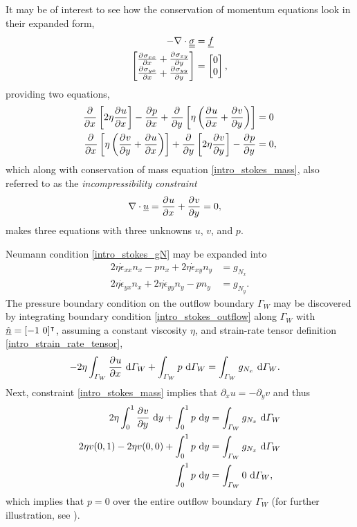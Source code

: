 It may be of interest to see how the conservation of momentum equations look in their expanded form,
\begin{align*}
  -\nabla \cdot \underline{\underline{\sigma}} &= \underline{f} \\
  \begin{bmatrix}
    \frac{\partial{^{}} \sigma_{xx}}{\partial x{^{}} } + \frac{\partial{^{}} \sigma_{xy}}{\partial y{^{}} } \\ 
    \frac{\partial{^{}} \sigma_{yx}}{\partial x{^{}} } + \frac{\partial{^{}} \sigma_{yy}}{\partial y{^{}} } \\ 
  \end{bmatrix} &=
  \begin{bmatrix}
    0 \\ 0
  \end{bmatrix},
\end{align*}
providing two equations,
\begin{align*}
    \frac{\partial{^{}} }{\partial x{^{}} } \left[2\eta \frac{\partial{^{}} u}{\partial x{^{}} } \right]  - \frac{\partial{^{}} p}{\partial x{^{}} } + \frac{\partial{^{}} }{\partial y{^{}} } \left[\eta \left( \frac{\partial{^{}} u}{\partial x{^{}} } + \frac{\partial{^{}} v}{\partial y{^{}} } \right) \right] &= 0 \\ 
    \frac{\partial{^{}} }{\partial x{^{}} } \left[\eta \left( \frac{\partial{^{}} v}{\partial y{^{}} } + \frac{\partial{^{}} u}{\partial x{^{}} } \right) \right]  + \frac{\partial{^{}} }{\partial y{^{}} } \left[2\eta \frac{\partial{^{}} v}{\partial y{^{}} } \right] - \frac{\partial{^{}} p}{\partial y{^{}} } &= 0, 
\end{align*}
which along with conservation of mass equation \cref{intro_stokes_mass}, also referred to as the \emph{incompressibility constraint}
\begin{align*}
  \nabla \cdot \underline{u} &= \frac{\partial{^{}} u}{\partial x{^{}} } + \frac{\partial{^{}} v}{\partial y{^{}} } = 0, 
\end{align*}
makes three equations with three unknowns $u$, $v$, and $p$.

Neumann condition \cref{intro_stokes_gN} may be expanded into
\begin{align}
  \label{intro_stokes_outflow}
  2 \eta \dot{\epsilon}_{xx} n_x - p n_x + 2 \eta \dot{\epsilon}_{xy} n_y &= g_{N_x} \\
  2 \eta \dot{\epsilon}_{yx} n_x + 2 \eta \dot{\epsilon}_{yy} n_y - p n_y &= g_{N_y}.
\end{align}
The pressure boundary condition on the outflow boundary $\Gamma_W$ may be discovered by integrating boundary condition \cref{intro_stokes_outflow} along $\Gamma_W$ with $\underline{\hat{n}} = [-1\ 0]^\intercal$, assuming a constant viscosity $\eta$, and strain-rate tensor definition \cref{intro_strain_rate_tensor},
\begin{align*}
  - 2 \eta \int_{\varGamma_W} \frac{\partial{^{}} u}{\partial x{^{}} } \ \mathrm{d}\varGamma_W + \int_{\varGamma_W} p \ \mathrm{d}\varGamma_W &= \int_{\varGamma_W} g_{N_x} \ \mathrm{d}\varGamma_W.
\end{align*}
Next, constraint \cref{intro_stokes_mass} implies that $\partial_x u = - \partial_y v$ and thus
\begin{align*}
  2 \eta \int_0^1 \frac{\partial{^{}} v}{\partial y{^{}} } \ \mathrm{d}y + \int_0^1 p \ \mathrm{d}y &= \int_{\varGamma_W} g_{N_x} \ \mathrm{d}\varGamma_W \\
  2 \eta v(0,1) - 2 \eta v(0,0) + \int_0^1 p \ \mathrm{d}y &= \int_{\varGamma_W} g_{N_x} \ \mathrm{d}\varGamma_W \\
  \int_0^1 p \ \mathrm{d}y &= \int_{\varGamma_W} 0 \ \mathrm{d}\varGamma_W,
\end{align*}
which implies that $p = 0$ over the entire outflow boundary $\Gamma_W$ (for further illustration, see \citet{elman_2005}).

